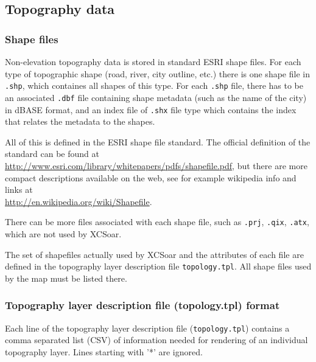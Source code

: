 \subsection{Topography data}
\subsubsection{Shape files}
Non-elevation topography data is stored in standard ESRI shape files. For each type of topographic shape (road, river, city outline, etc.) there is one shape file in \texttt{.shp}, which containes all shapes of this type. For each \texttt{.shp} file, there has to be an associated \texttt{.dbf} file containing shape metadata (such as the name of the city) in dBASE format, and an index file of \texttt{.shx} file type which contains the index that relates the metadata to the shapes. 

All of this is defined in the ESRI shape file standard. The official definition of the standard can be found at\\ \href{http://www.esri.com/library/whitepapers/pdfs/shapefile.pdf}{http://www.esri.com/library/whitepapers/pdfs/shapefile.pdf}, but there are more compact descriptions available on the web, see for example wikipedia info and links at \\ \href{http://en.wikipedia.org/wiki/Shapefile}{http://en.wikipedia.org/wiki/Shapefile}.

There can be more files associated with each shape file, such as \texttt{.prj}, \texttt{.qix}, \texttt{.atx}, which are not used by XCSoar.

The set of shapefiles actually used by XCSoar and the attributes of each file are defined in the topography layer description file \texttt{topology.tpl}. All shape files used by the map must be listed there.

\subsubsection{Topography layer description file (topology.tpl) format}

Each line of the topography layer description file (\texttt{topology.tpl}) contains
a comma separated list (CSV) of information needed for rendering of an
individual topography layer. Lines starting with '*' are ignored.

